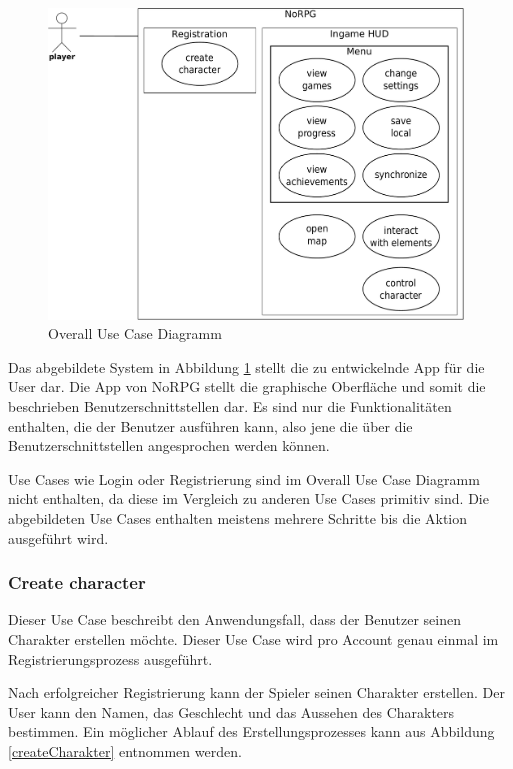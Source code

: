 		\begin{figure}[htbp]
			\centering 
			\label{oucd}
			\includegraphics[width=11cm]{pics/OUCD.pdf}
			\caption{Overall Use Case Diagramm}
		\end{figure}
		
		Das abgebildete System in Abbildung \ref{oucd} stellt die zu entwickelnde App für die User dar. Die App von NoRPG stellt die graphische Oberfläche und somit die beschrieben Benutzerschnittstellen dar. Es sind nur die Funktionalitäten enthalten, die der Benutzer ausführen kann, also jene die über die Benutzerschnittstellen angesprochen werden können. 
		
		Use Cases wie Login oder Registrierung sind im Overall Use Case Diagramm nicht enthalten, da diese im Vergleich zu anderen Use Cases primitiv sind. Die abgebildeten Use Cases enthalten meistens mehrere Schritte bis die Aktion ausgeführt wird.
	
		\subsubsection{Create character}
			Dieser Use Case beschreibt den Anwendungsfall, dass der Benutzer seinen Charakter erstellen möchte. Dieser Use Case wird pro Account genau einmal im Registrierungsprozess ausgeführt.
			
			Nach erfolgreicher Registrierung kann der Spieler seinen Charakter erstellen. Der User kann den Namen, das Geschlecht und das Aussehen des Charakters bestimmen. Ein möglicher Ablauf des Erstellungsprozesses kann aus Abbildung \ref{createCharakter} entnommen werden.
			
